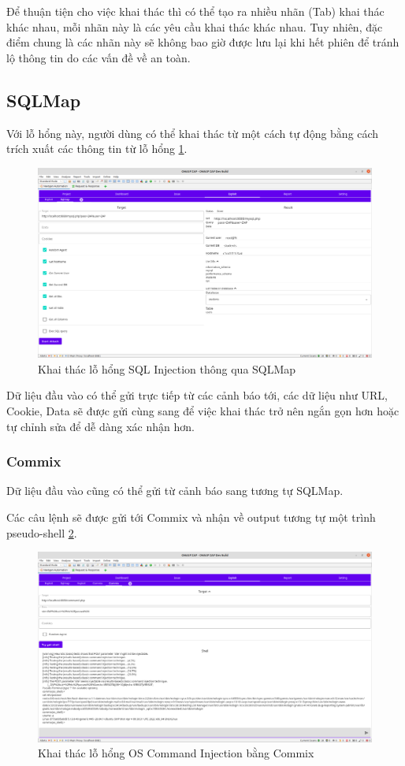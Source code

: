 \documentclass[./../main.tex]{subfiles}
\begin{document}
Để thuận tiện cho việc khai thác thì có thể tạo ra nhiều nhãn (Tab)
khai thác khác nhau, mỗi nhãn này là các yêu cầu khai thác khác nhau.
Tuy nhiên, đặc điểm chung là các nhãn này sẽ không bao giờ được lưu lại
khi hết phiên để tránh lộ thông tin do các vấn đề về an toàn.
\subsection{SQLMap}
Với lỗ hổng này, người dùng có thể khai thác từ một cách tự động
bằng cách trích xuất các thông tin từ lỗ hổng \ref{fig:sqlmap_explot}.

\begin{figure}[ht!]
	\includegraphics[width=\linewidth]{./images/sqlmap_explot.png}
	\caption{Khai thác lỗ hổng SQL Injection thông qua SQLMap}
	\label{fig:sqlmap_explot}
\end{figure}
Dữ liệu đầu vào có thể gửi trực tiếp từ các cảnh báo tới, các dữ
liệu như URL, Cookie, Data sẽ được gửi cùng sang để việc khai thác
trở nên ngắn gọn hơn hoặc tự chỉnh sửa để dễ dàng xác nhận hơn.
\subsubsection{Commix}

Dữ liệu đầu vào cũng có thể gửi từ cảnh báo sang tương tự SQLMap.

Các câu lệnh sẽ được gửi tới Commix và nhận về output tương tự một
trình pseudo-shell \ref{fig:commix_exploit}.

\begin{figure}[ht!]
	\includegraphics[width=\linewidth]{./images/commix_exploit.png}
	\caption{Khai thác lỗ hổng OS Command Injection bằng Commix	}
	\label{fig:commix_exploit}
\end{figure}
\end{document}
